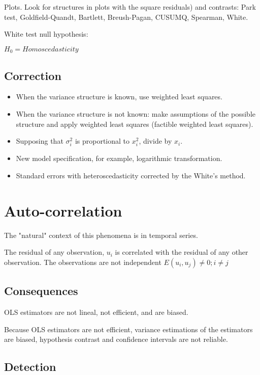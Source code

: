 \documentclass[10pt,landscape]{article}
\begin{document}
\begin{multicols}{3}
Plots. Look for structures in plots with the square residuals) and contrasts: Park test, Goldfield-Quandt, Bartlett, Breush-Pagan, CUSUMQ, Spearman, White.

White test null hypothesis:

$H_0 = Homoscedasticity$

\subsection*{Correction}

\begin{itemize}[leftmargin=*]
\item When the variance structure is known, use weighted least squares.
\item When the variance structure is not known: make assumptions of the possible structure and apply weighted least squares (factible weighted least squares).
\item Supposing that $\sigma_i^2$ is proportional to $x_i^2$, divide by $x_i$.
\item New model specification, for example, logarithmic transformation.
\item Standard errors with heteroscedasticity corrected by the White's method.
\end{itemize}

\section*{Auto-correlation}

The "natural" context of this phenomena is in temporal series.

The residual of any observation, $u_i$ is correlated with the residual of any other observation. The observations are not independent $E(u_i,u_j) \neq 0; i \neq j$

\subsection*{Consequences}

OLS estimators are not lineal, not efficient, and are biased.

Because OLS estimators are not efficient, variance estimations of the estimators are biased, hypothesis contrast and confidence intervals are not reliable.

\subsection*{Detection}


\end{multicols}
\end{document}
